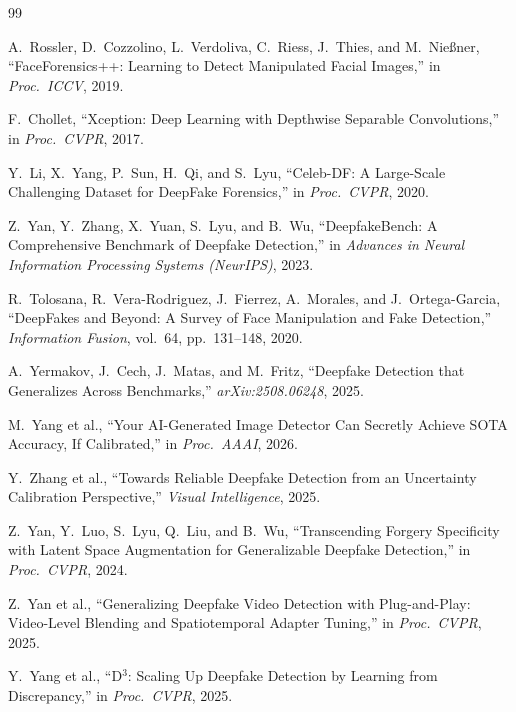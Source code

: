 \documentclass[a4paper,12pt]{report}
\begin{document}
\begin{thebibliography}{99}

A.~Rossler, D.~Cozzolino, L.~Verdoliva, C.~Riess,
J.~Thies, and M.~Nie{\ss}ner,
``FaceForensics++: Learning to Detect Manipulated Facial
Images,''
in \textit{Proc.\ ICCV}, 2019.

F.~Chollet,
``Xception: Deep Learning with Depthwise Separable
Convolutions,''
in \textit{Proc.\ CVPR}, 2017.

Y.~Li, X.~Yang, P.~Sun, H.~Qi, and S.~Lyu,
``Celeb-DF: A Large-Scale Challenging Dataset for
DeepFake Forensics,''
in \textit{Proc.\ CVPR}, 2020.

Z.~Yan, Y.~Zhang, X.~Yuan, S.~Lyu, and B.~Wu,
``DeepfakeBench: A Comprehensive Benchmark of Deepfake
Detection,''
in \textit{Advances in Neural Information Processing
Systems (NeurIPS)}, 2023.

R.~Tolosana, R.~Vera-Rodriguez, J.~Fierrez,
A.~Morales, and J.~Ortega-Garcia,
``DeepFakes and Beyond: A Survey of Face Manipulation
and Fake Detection,''
\textit{Information Fusion}, vol.~64,
pp.~131--148, 2020.

A.~Yermakov, J.~Cech, J.~Matas, and M.~Fritz,
``Deepfake Detection that Generalizes Across Benchmarks,''
\textit{arXiv:2508.06248}, 2025.

M.~Yang et al.,
``Your AI-Generated Image Detector Can Secretly Achieve
SOTA Accuracy, If Calibrated,''
in \textit{Proc.\ AAAI}, 2026.

Y.~Zhang et al.,
``Towards Reliable Deepfake Detection from an Uncertainty
Calibration Perspective,''
\textit{Visual Intelligence}, 2025.

Z.~Yan, Y.~Luo, S.~Lyu, Q.~Liu, and B.~Wu,
``Transcending Forgery Specificity with Latent Space
Augmentation for Generalizable Deepfake Detection,''
in \textit{Proc.\ CVPR}, 2024.

Z.~Yan et al.,
``Generalizing Deepfake Video Detection with Plug-and-Play:
Video-Level Blending and Spatiotemporal Adapter Tuning,''
in \textit{Proc.\ CVPR}, 2025.

Y.~Yang et al.,
``D$^3$: Scaling Up Deepfake Detection by Learning from
Discrepancy,''
in \textit{Proc.\ CVPR}, 2025.

\end{thebibliography}
\end{document}
